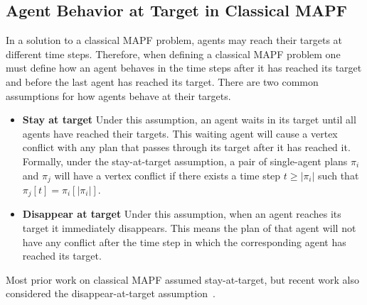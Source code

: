 \documentclass[letterpaper]{article} %
\begin{document}
\subsection{Agent Behavior at Target in Classical MAPF}
In a solution to a classical MAPF problem,
agents may reach their targets at different time steps.
Therefore, when defining a classical MAPF problem one must define
how an agent behaves in the time steps after it has reached its target and before the last agent has reached its target.
There are two common assumptions for how agents behave at their targets.
\begin{itemize}
\item \textbf{Stay at target} Under this assumption,
an agent waits in its target until all agents have reached their targets.
This waiting agent will cause a vertex conflict with any plan that passes through
its target after it has reached it.
Formally, under the stay-at-target assumption,
a pair of single-agent plans $\pi_i$ and $\pi_j$ will have a vertex conflict
if there exists a time step $t\geq |\pi_i|$ such that $\pi_j[t]=\pi_i[|\pi_i|]$.
\item \textbf{Disappear at target} Under this assumption,
when an agent reaches its target it immediately disappears.
This means the plan of that agent will not have any conflict after
the time step in which the corresponding agent has reached its target.
\end{itemize}
Most prior work on classical MAPF assumed stay-at-target, but recent work also considered the disappear-at-target assumption~\cite{MaAAAI19a}.
\end{document}
